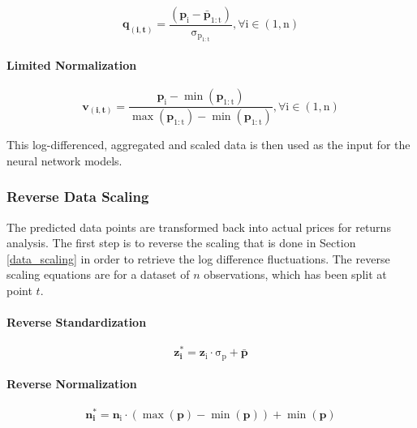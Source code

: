 \documentclass[a4paper,11pt,oneside]{article}
\theoremstyle{plain}
\theoremstyle{definition}
\begin{document}
	\begin{equation}
	\mathbf{q_{(i, t)}} =\mathrm{ \frac{(\mathbf{p}_i - \bar{\mathbf{p}}_{1:t}) }{\sigma_{p_{1:t}}} , \forall  i \in (1, n)}
	\end{equation}
	
	\paragraph{Limited Normalization}
	
	\begin{equation}\label{eq_ltd_normalize}
	\mathbf{v_{(i, t)}}  = 
	\mathrm{ \frac{\mathbf{p}_i - \min \left(  \mathbf{p}_{1:t}\right)}
		{\max \left( \mathbf{p}_{1:t} \right)- \min \left( \mathbf{p}_{1:t} \right) } 
		, \forall  i \in (1, n)}
	\end{equation}
	
	
	This log-differenced, aggregated and scaled data is then used as the input for the neural network models.
	
	\subsubsection{Reverse Data Scaling}\label{data_reverse_scaling}
	
	The predicted data points are transformed back into actual prices for returns analysis. The first step is to reverse the scaling that is done in Section \ref{data_scaling} in order to retrieve the log difference fluctuations. The reverse scaling equations are for a dataset of $n$ observations, which has been split at point $t$.
	
	\paragraph{Reverse Standardization}
	
	\begin{equation}
	\mathbf{z^{*}_i} = \mathrm{{\mathbf{z}_i} \cdot \sigma_p + \mathbf{\bar{p}}}
	\end{equation}
	
	\paragraph{Reverse Normalization}
	
	\begin{equation}
	\mathbf{n^{*}_i} = \mathrm{\mathbf{n}_i \cdot \left(\max \left( {\mathbf{p}} \right) - \min \left( {\mathbf{p}} \right) \right) + \min\left({\mathbf{p}}\right)}
	\end{equation}
	
\end{document}
